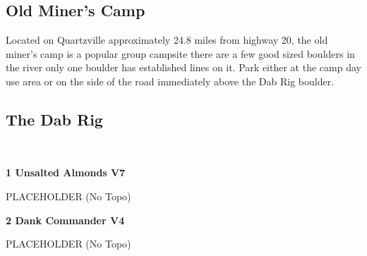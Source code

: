 \begin{multicols}{2}
		\section{Old Miner's Camp}\label{sa:Old Miner's Camp}
	\begin{minipage}{\columnwidth}
	Located on Quartzville approximately 24.8 miles from highway 20, the old miner's camp is a popular group campsite there are a few good sized boulders in the river only one boulder has established lines on it. Park either at the camp day use area or on the side of the road immediately above the Dab Rig boulder.
	\end{minipage}
			\subsection*{The Dab Rig}\label{bf:The Dab Rig}
			\begin{minipage}{\columnwidth}
			\
			\end{minipage}
			
					\begin{minipage}{\linewidth}	
					\label{rt:Unsalted Almonds}\colorbox{Goldenrod!50}{\textbf{1 Unsalted Almonds V7  }}
					\begin{adjustwidth}{0.5cm}{}				
					PLACEHOLDER
						\newline (No Topo) 
					\end{adjustwidth}
					\end{minipage}
					\begin{minipage}{\linewidth}	
					\label{rt:Dank Commander}\colorbox{RoyalBlue!20}{\textbf{2 Dank Commander V4  }}
					\begin{adjustwidth}{0.5cm}{}				
					PLACEHOLDER
						\newline (No Topo) 
					\end{adjustwidth}
					\end{minipage}
\end{multicols}
\clearpage